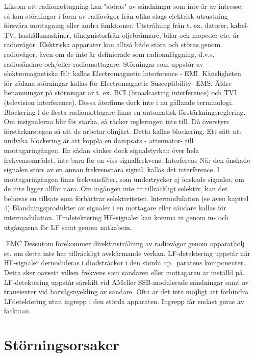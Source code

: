 \documentclass[a4paper,twoside,twocolumn,openright]{book}
\begin{document}
{{{{{Liksom att radiomottagning kan "störas" av
sändningar som inte är av intresse, så kan
störningar i form av radiovågor från olika
slags elektrisk utrustning försvåra mottagning eller andra funktioner.
Utstrålning från t. ex. datorer, kabel-TV,
hushållsmaskiner, tändgnistorfrån oljebrännare, bilar och mopeder etc. är radiovågor.
Elektriska apparater kan alltså både störa
och störas genom radiovågor, även om de
inte är definierade som radioanläggning,
d.v.s. radiosändare och/eller radiomottagare.
Störningar som uppstår av elektromagnetiska fält kallas Electromagnetic lnterference - EMI. Känsligheten för sådana störningar kallas för Electromagnetic Susceptibility- EMS.
Äldre benämningar på störningar är t. ex.
BCI (broadcasting interference) och TVI (television interference). Dessa återfinns dock
inte i nu gällande terminologi.
Blockering
l de flesta radiomottagare finns en automatisk förstärkningsreglering. Om insignalerna
blir för starka, så räcker regleringen inte till.
Då överstyrs förstärkarstegen så att de arbetar olinjärt. Detta kallas blockering.
Ett sätt att undvika blockering är att koppla en dämpsats - attenuator- till mottagaringången. En sådan sänker dock signalstyrkan över hela frekvensområdet, inte bara för
en viss signalfrekvens.
Interferens
När den önskade signalen störs av en annan frekvensnära signal, kallas det interference. l mottagaringången finns frekvensfilter, som undertrycker ej önskade signaler,
om de inte ligger allför nära. Om ingången
inte är tillräckligt selektiv, kan det behövas
en tillsats som förbättrar selektiviteten.
lntermodulation (se även kapitel 4)
Blandningsprodukter av signaler i en mottagare eller sändare kallas för intermodulation.
lFmdetektering
HF-signaler kan komma in genom in- och
utgångarna för LF samt genom nätkabein.

EMC
Dessutom förekommer direktinstrålning
av radiovågor genom apparathölj et, om detta
inte har tillräckligt avskärmande verkan.
LF-detektering uppstår när HF-signaler
dernoduleras i diodsträckor i den störda ap~
paratens komponenter. Detta sker oavsett
vilken frekvens som sändaren eller mottagaren är inställd på.
LF-detektering uppstår särskilt vid AMeller SSB-modulerade sändningar samt av
transienter vid bärvågsnyekling av sändare.
Ofta är det inte möjligt att förhindra LFdetektering utan ingrepp i den störda apparaten. Ingrepp får endast göras av fackman.

\section{Störningsorsaker}

}}}}}
\end{document}
